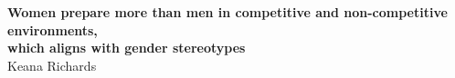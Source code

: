 \thispagestyle{empty}
\begin{center}
\Huge{\textbf{Women prepare more than men in competitive and non-competitive environments,}} \\
\Huge{\textbf{which aligns with gender stereotypes}} \\
\vspace*{1cm}
\vspace*{1cm}
\vspace*{\fill}
\large{Keana Richards}\\
\end{center}
